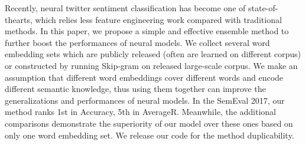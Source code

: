 Recently, neural twitter sentiment classification has become one of state-of-thearts, which relies less feature engineering work compared with traditional methods. In this paper, we propose a simple and effective ensemble method to further boost the performances of neural models. We collect several word embedding sets which are publicly released (often are learned on different corpus) or constructed by running Skip-gram on released large-scale corpus. We make an assumption that different word embeddings cover different words and encode different semantic knowledge, thus using them together can improve the generalizations and performances of neural models. In the SemEval 2017, our method ranks 1st in Accuracy, 5th in AverageR. Meanwhile, the additional comparisons demonstrate the superiority of our model over these ones based on only one word embedding set. We release our code for the method duplicability.
